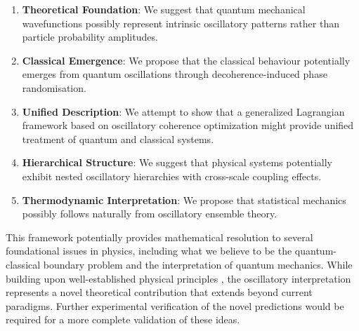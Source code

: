 \documentclass[11pt]{article}
\theoremstyle{remark}
\begin{document}
\begin{enumerate}
\item \textbf{Theoretical Foundation}: We suggest that quantum mechanical wavefunctions possibly represent intrinsic oscillatory patterns rather than particle probability amplitudes.

\item \textbf{Classical Emergence}: We propose that the classical behaviour potentially emerges from quantum oscillations through decoherence-induced phase randomisation.

\item \textbf{Unified Description}: We attempt to show that a generalized Lagrangian framework based on oscillatory coherence optimization might provide unified treatment of quantum and classical systems.

\item \textbf{Hierarchical Structure}: We suggest that physical systems potentially exhibit nested oscillatory hierarchies with cross-scale coupling effects.

\item \textbf{Thermodynamic Interpretation}: We propose that statistical mechanics possibly follows naturally from oscillatory ensemble theory.
\end{enumerate}

This framework potentially provides mathematical resolution to several foundational issues in physics, including what we believe to be the quantum-classical boundary problem and the interpretation of quantum mechanics. While building upon well-established physical principles \cite{dirac1958quantum,pathria2011statistical,goldstein2002classical}, the oscillatory interpretation represents a novel theoretical contribution that extends beyond current paradigms. Further experimental verification of the novel predictions would be required for a more complete validation of these ideas.
\end{document}
